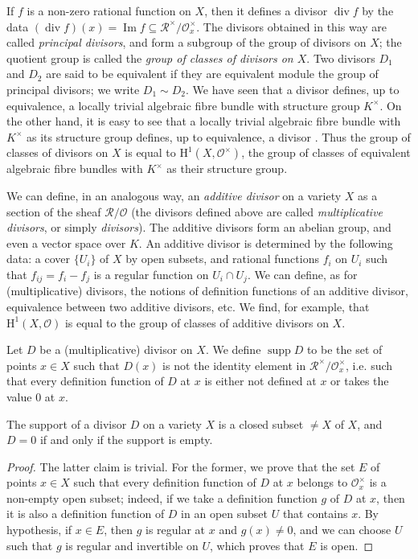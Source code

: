 \documentclass{article}
\theoremstyle{plain}
\newenvironment{proposition}[1]
    {\renewcommand\theinnercustomproposition{#1}\innercustomproposition}
    {\endinnercustomproposition}
\theoremstyle{definition}
\newcommand{\sh}{\mathscr}
\newcommand{\HH}{\mathrm{H}}
\renewcommand{\Im}{\operatorname{Im}}
\renewcommand{\div}{\operatorname{div}}
\DeclareMathOperator{\supp}{supp}
\newcommand{\oldpage}[1]{\marginpar{\footnotesize$\Big\vert$ \textit{p.~#1}}}
\begin{document}
If $f$ is a non-zero rational function on $X$, then it defines a divisor $\div f$ by the data $(\div f)(x)=\Im f\subseteq\sh{R}^\times/\sh{O}_x^\times$.
The divisors
\oldpage{4-07}
obtained in this way are called \emph{principal divisors}, and form a subgroup of the group of divisors on $X$;
the quotient group is called the \emph{group of classes of divisors on $X$}.
Two divisors $D_1$ and $D_2$ are said to be equivalent if they are equivalent module the group of principal divisors;
we write $D_1\sim D_2$.
We have seen that a divisor defines, up to equivalence, a locally trivial algebraic fibre bundle with structure group $K^\times$.
On the other hand, it is easy to see that a locally trivial algebraic fibre bundle with $K^\times$ as its structure group defines, up to equivalence, a divisor \cite{7}.
Thus the group of classes of divisors on $X$ is equal to $\HH^1(X,\sh{O}^\times)$, the group of classes of equivalent algebraic fibre bundles with $K^\times$ as their structure group.

We can define, in an analogous way, an \emph{additive divisor} on a variety $X$ as a section of the sheaf $\sh{R}/\sh{O}$ (the divisors defined above are called \emph{multiplicative divisors}, or simply \emph{divisors}).
The additive divisors form an abelian group, and even a vector space over $K$.
An additive divisor is determined by the following data: a cover $\{U_i\}$ of $X$ by open subsets, and rational functions $f_i$ on $U_i$ such that $f_{ij}=f_i-f_j$ is a regular function on $U_i\cap U_j$.
We can define, as for (multiplicative) divisors, the notions of definition functions of an additive divisor, equivalence between two additive divisors, etc.
We find, for example, that $\HH^1(X,\sh{O})$ is equal to the group of classes of additive divisors on $X$.

Let $D$ be a (multiplicative) divisor on $X$.
We define $\supp D$ to be the set of points $x\in X$ such that $D(x)$ is not the identity element in $\sh{R}^\times/\sh{O}_x^\times$, i.e. such that every definition function of $D$ at $x$ is either not defined at $x$ or takes the value $0$ at $x$.

\begin{proposition}{7}
\label{proposition7}
  The support of a divisor $D$ on a variety $X$ is a closed subset $\neq X$ of $X$, and $D=0$ if and only if the support is empty.
\end{proposition}

\begin{proof}
  The latter claim is trivial.
  For the former, we prove that the set $E$ of points $x\in X$ such that every definition function of $D$ at $x$ belongs to $\sh{O}_x^\times$ is a non-empty open subset;
  indeed, if we take a definition function $g$ of $D$ at $x$, then it is also a definition function of $D$ in an open subset $U$ that contains $x$.
  By hypothesis, if $x\in E$, then $g$ is regular at $x$ and $g(x)\neq0$, and we can choose $U$ such that $g$ is regular and invertible on $U$, which proves that $E$ is open.
\end{proof}
\end{document}
